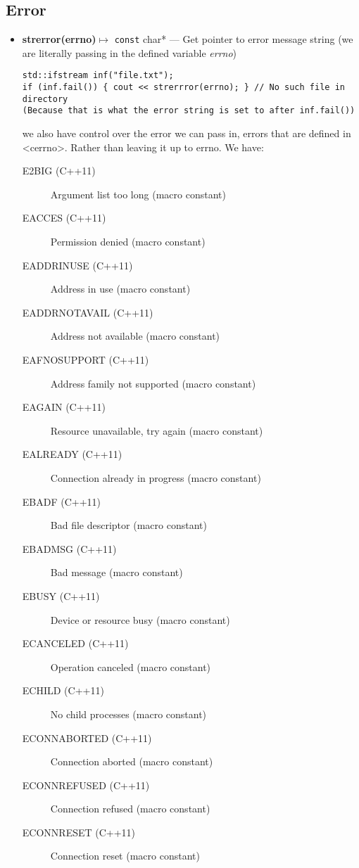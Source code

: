 \documentclass{report}
\begin{document}
    \bigbreak \noindent 
    \subsection{Error}
    \begin{itemize}
        \item \textbf{strerror(errno)}$\mapsto$ \texttt{const} char* ---  Get pointer to error message string (we are literally passing in the defined variable \textit{errno})
            \begin{verbatim}
std::ifstream inf("file.txt");
if (inf.fail()) { cout << strerrror(errno); } // No such file in directory 
(Because that is what the error string is set to after inf.fail())
            \end{verbatim}
        we also have control over the error we can pass in, errors that are defined in <cerrno>. Rather than leaving it up to errno. We have:
    \begin{description}
      \item[E2BIG (C++11)] Argument list too long (macro constant)
      \item[EACCES (C++11)] Permission denied (macro constant)
      \item[EADDRINUSE (C++11)] Address in use (macro constant)
      \item[EADDRNOTAVAIL (C++11)] Address not available (macro constant)
      \item[EAFNOSUPPORT (C++11)] Address family not supported (macro constant)
      \item[EAGAIN (C++11)] Resource unavailable, try again (macro constant)
      \item[EALREADY (C++11)] Connection already in progress (macro constant)
      \item[EBADF (C++11)] Bad file descriptor (macro constant)
      \item[EBADMSG (C++11)] Bad message (macro constant)
      \item[EBUSY (C++11)] Device or resource busy (macro constant)
      \item[ECANCELED (C++11)] Operation canceled (macro constant)
      \item[ECHILD (C++11)] No child processes (macro constant)
      \item[ECONNABORTED (C++11)] Connection aborted (macro constant)
      \item[ECONNREFUSED (C++11)] Connection refused (macro constant)
      \item[ECONNRESET (C++11)] Connection reset (macro constant)

\end{description}
\end{itemize}
\end{document}
